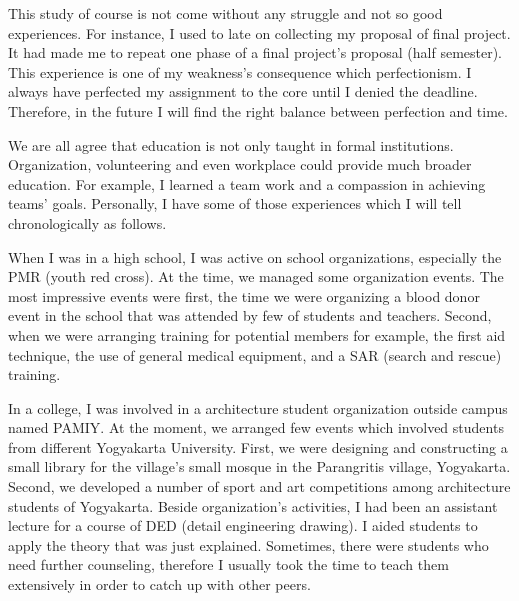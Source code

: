 \documentclass[../main.tex]{subfiles}
\begin{document}
\begin{tcolorbox}
	This study of course is not come without any struggle and not so good experiences. For instance, I used to late on collecting my proposal of final project. It had made me to repeat one phase of a final project's proposal (half semester). This experience is one of my weakness's consequence which perfectionism. I always have perfected my assignment to the core until I denied the deadline. Therefore, in the future I will find the right balance between perfection and time.

	We are all agree that education is not only taught in formal institutions. Organization, volunteering and even workplace could provide much broader education. For example, I learned a team work and a compassion in achieving teams' goals. Personally, I have some of those experiences which I will tell chronologically as follows.

	When I was in a high school, I was active on school organizations, especially the PMR (youth red cross). At the time, we managed some organization events. The most impressive events were first, the time we were organizing a blood donor event in the school that was attended by few of students and teachers. Second, when we were arranging training for potential members for example, the first aid technique, the use of general medical equipment, and a SAR (search and rescue) training.

	In a college, I was involved in a architecture student organization outside campus named PAMIY. At the moment, we arranged few events which involved students from different Yogyakarta University. First, we were designing and constructing a small library for the village's small mosque in the Parangritis village, Yogyakarta. Second, we developed a number of sport and art competitions among architecture students of Yogyakarta. Beside organization's activities, I had been an assistant lecture for a course of DED (detail engineering drawing). I aided students to apply the theory that was just explained. Sometimes, there were  students who need further counseling, therefore I usually took the time to teach them extensively in order to catch up with other peers.


\end{tcolorbox}
\end{document}
